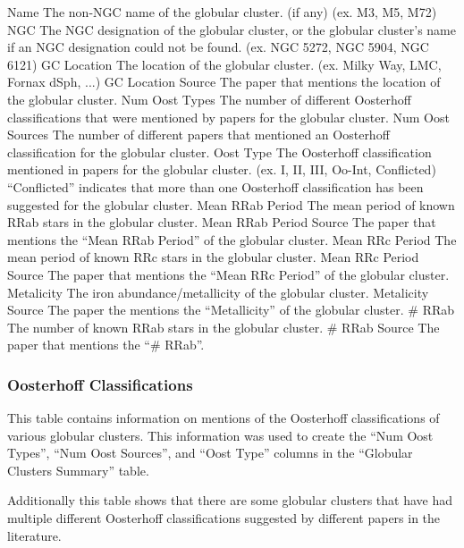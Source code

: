 \documentclass[]{article}
\begin{document}
\begin{outline}
	\1 Name
	\2 The non-NGC name of the globular cluster. (if any) (ex. M3, M5, M72)
	\1 NGC
	\2 The NGC designation of the globular cluster, or the globular cluster’s name if an NGC designation could not be found. (ex. NGC 5272, NGC 5904, NGC 6121)
	\1 GC Location
	\2 The location of the globular cluster. (ex. Milky Way, LMC, Fornax dSph, ...)
	\1 GC Location Source
	\2 The paper that mentions the location of the globular cluster.
	\1 Num Oost Types
	\2 The number of different Oosterhoff classifications that were mentioned by papers for the globular cluster.
	\1 Num Oost Sources
	\2 The number of different papers that mentioned an Oosterhoff classification for the globular cluster.
	\1 Oost Type
	\2 The Oosterhoff classification mentioned in papers for the globular cluster. (ex. I, II, III, Oo-Int, Conflicted)
	\2 ``Conflicted'' indicates that more than one Oosterhoff classification has been suggested for the globular cluster.
	\1 Mean RRab Period
	\2 The mean period of known RRab stars in the globular cluster.
	\1 Mean RRab Period Source
	\2 The paper that mentions the ``Mean RRab Period'' of the globular cluster.
	\1 Mean RRc Period
	\2 The mean period of known RRc stars in the globular cluster.
	\1 Mean RRc Period Source
	\2 The paper that mentions the ``Mean RRc Period'' of the globular cluster.
	\1 Metalicity
	\2 The iron abundance/metallicity of the globular cluster.
	\1 Metalicity Source
	\2 The paper the mentions the ``Metallicity'' of the globular cluster.
	\1 \# RRab
	\2 The number of known RRab stars in the globular cluster.
	\1 \# RRab Source
	\2 The paper that mentions the ``\# RRab''.
\end{outline}

\newpage

\subsubsection{Oosterhoff Classifications}

This table contains information on mentions of the Oosterhoff classifications of various globular clusters. This information was used to create the ``Num Oost Types'', ``Num Oost Sources'', and ``Oost Type'' columns in the ``Globular Clusters Summary'' table.

\vspace{12pt}

Additionally this table shows that there are some globular clusters that have had multiple different Oosterhoff classifications suggested by different papers in the literature.
\end{document}
